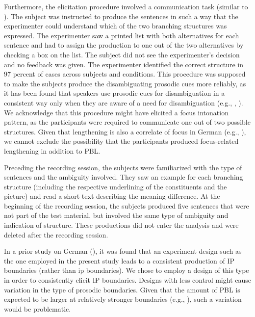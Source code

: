 \documentclass[output=paper]{langscibook}
\begin{document}
Furthermore, the elicitation procedure involved a communication task (similar to \citealt{PetroneEtal2017}). The subject was instructed to produce the sentences in such a way that the experimenter could understand which of the two branching structures was expressed. The experimenter saw a printed list with both alternatives for each sentence and had to assign the production to one out of the two alternatives by checking a box on the list. The subject did not see the experimenter's decision and no feedback was given. The experimenter identified the correct structure in 97 percent of cases across subjects and conditions. This procedure was supposed to make the subjects produce the disambiguating prosodic cues more reliably, as it has been found that speakers use prosodic cues for disambiguation in a consistent way only when they are aware of a need for disambiguation (e.g., \citealt{SnedekerTrueswell2003}, \citealt{SchuboeEtal2015}). We acknowledge that this procedure might have elicited a focus intonation pattern, as the participants were required to communicate one out of two possible structures. Given that lengthening is also a correlate of focus in German (e.g., \citealt{FeryKuegler2008}), we cannot exclude the possibility that the participants produced focus-related lengthening in addition to PBL.

Preceding the recording session, the subjects were familiarized with the type of sentences and the ambiguity involved. They saw an example for each branching structure (including the respective underlining of the constituents and the picture) and read a short text describing the meaning difference. At the beginning of the recording session, the subjects produced five sentences that were not part of the test material, but involved the same type of ambiguity and indication of structure. These productions did not enter the analysis and were deleted after the recording session.

In a prior study on German (\citealt{PetroneEtal2017}), it was found that an experiment design such as the one employed in the present study leads to a consistent production of IP boundaries (rather than ip boundaries). We chose to employ a design of this type in order to consistently elicit IP boundaries. Designs with less control might cause variation in the type of prosodic boundaries. Given that the amount of PBL is expected to be larger at relatively stronger boundaries (e.g., \citealt{PetersEtal2005}), such a variation would be problematic.
\end{document}
